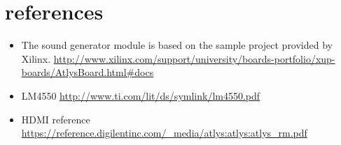 \newpage
\section{references}
\begin{itemize} 
\item The sound generator module is based on the sample project provided by Xilinx. \url{http://www.xilinx.com/support/university/boards-portfolio/xup-boards/AtlysBoard.html#docs}
\item LM4550 \url{http://www.ti.com/lit/ds/symlink/lm4550.pdf}
\item HDMI reference \url{https://reference.digilentinc.com/_media/atlys:atlys:atlys_rm.pdf}
\end{itemize}
